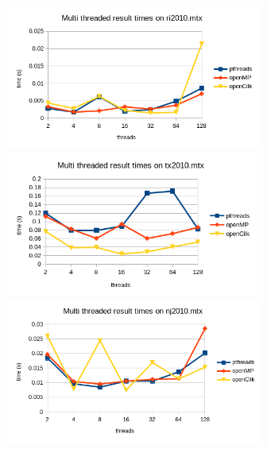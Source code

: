 \documentclass[11pt]{article}
\begin{document}
\begin{center}
\includegraphics[height=180]{./charts/ri2010.png}
\includegraphics[height=180]{./charts/tx2010.png}
\includegraphics[height=180]{./charts/nj2010.png}
\end{center}
\end{document}
